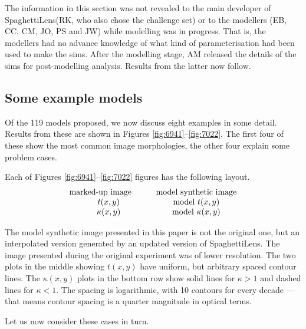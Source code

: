 \documentclass[usenatbib]{mn2e}
\newcommand{\spl}{SpaghettiLens\xspace}
\begin{document}
\FloatBarrier

The information in this section was not revealed to the main developer
of \spl (RK, who also chose the challenge set) or to the modellers
(EB, CC, CM, JO, PS and JW) while modelling was in progress.  That is,
the modellers had no advance knowledge of what kind of
parameterisation had been used to make the sims.  After the modelling
stage, AM released the details of the sims for post-modelling
analysis.  Results from the latter now follow.



\subsection{Some example models} \label{sec:example_models}

Of the 119 models proposed, we now discuss eight examples in some
detail.  Results from these are shown in Figures
\ref{fig:6941}--\ref{fig:7022}.  The first four of these show the most
common image morphologies, the other four explain some problem cases.

Each of Figures \ref{fig:6941}--\ref{fig:7022} figures has the
following layout.
$$ \begin{matrix}
\hbox{marked-up image} \qquad &\hbox{model synthetic image} \\
t(x,y)                        &\hbox{model } t(x,y) \\
\kappa(x,y)                   &\hbox{model } \kappa(x,y)
\end{matrix} $$

The model synthetic image presented in this paper is not the original one,
but an interpolated version generated by an updated version of \spl. The image
presented during the original experiment was of lower resolution. The two plots in
the middle showing $t(x,y)$ have uniform, but arbitrary spaced contour lines.
The $\kappa(x,y)$ plots in the bottom row show solid lines for $\kappa>1$
and dashed lines for $\kappa<1$. The spacing is logarithmic, with 10 contours
for every decade --- that means contour spacing is a quarter magnitude in
optical terms.

Let us now consider these cases in turn.
\end{document}
